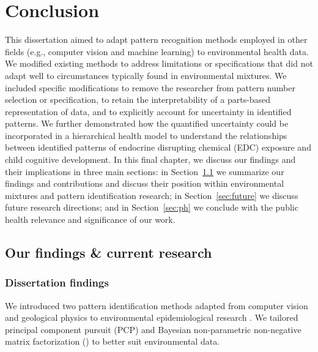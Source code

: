\chapter{Conclusion}\label{sec:conclusion}
\clearpage
This dissertation aimed to adapt pattern recognition methods employed in other fields (e.g., computer vision and machine learning) to environmental health data. We modified existing methods to address limitations or specifications that did not adapt well to circumstances typically found in environmental mixtures.  We included specific modifications to remove the researcher from pattern number selection or specification, to retain the interpretability of a parts-based representation of data, and to explicitly account for uncertainty in identified patterns. We further demonstrated how the quantified uncertainty could be incorporated in a hierarchical health model to understand the relationships between identified patterns of endocrine disrupting chemical (EDC) exposure and child cognitive development. In this final chapter, we discuss our findings and their implications in three main sections: in Section~\ref{sec:summarize} we summarize our findings and contributions and discuss their position within environmental mixtures and pattern identification research; in Section~\ref{sec:future} we discuss future research directions; and in Section~\ref{sec:ph} we conclude with the public health relevance and significance of our work.

\section{Our findings \& current research}\label{sec:summarize}

\subsection{Dissertation findings}\label{sec:findings}
We introduced two pattern identification methods adapted from computer vision and geological physics to environmental epidemiological research \cite{candes2011robust, zhou2010stable, holtzman2018machine}. We tailored principal component pursuit (PCP) and Bayesian non-parametric non-negative matrix factorization (\bnmfc) to better suit environmental data.

